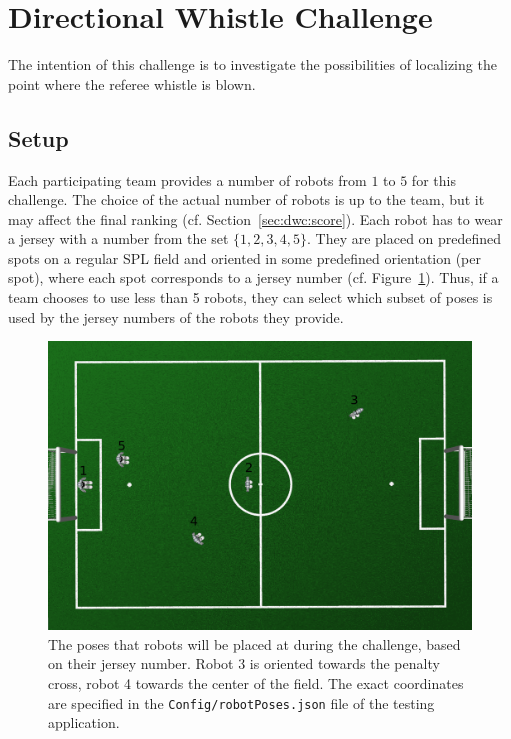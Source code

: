 \documentclass[12pt]{article}
\newcommand{\cf}{\mbox{cf.}\xspace}
\begin{document}
\newpage

\section{Directional Whistle Challenge}

The intention of this challenge is to investigate the possibilities of localizing the point where the referee whistle is blown.

\subsection{Setup}
\label{sec:dwc:setup}
Each participating team provides a number of robots from \(1\) to \(5\) for this challenge. The choice of the actual number of robots is up to the team, but it may affect the final ranking (\cf Section~\ref{sec:dwc:score}). Each robot has to wear a jersey with a number from the set \(\{1,2,3,4,5\}\). They are placed on predefined spots on a regular SPL field and oriented in some predefined orientation (per spot), where each spot corresponds to a jersey number (\cf Figure~\ref{fig:dwc:poses}). Thus, if a team chooses to use less than 5 robots, they can select which subset of poses is used by the jersey numbers of the robots they provide.

\begin{figure}[b!]
  \centerline{\includegraphics[width=\columnwidth]{figures/dwc-poses}}
  \caption{The poses that robots will be placed at during the challenge, based on their jersey number. Robot 3 is oriented towards the penalty cross, robot 4 towards the center of the field. The exact coordinates are specified in the \texttt{Config/robotPoses.json} file of the testing application.}
  \label{fig:dwc:poses}
\end{figure}
\end{document}
